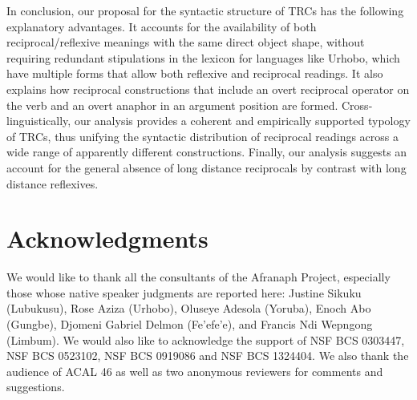 \documentclass[output=paper]{langsci/langscibook}
\begin{document}
In conclusion, our proposal for the syntactic structure of TRCs has the following explanatory advantages. It accounts for the availability of both reciprocal/reflexive meanings with the same direct object shape, without requiring redundant stipulations in the lexicon for languages like Urhobo, which have multiple forms that allow both reflexive and reciprocal readings. It also explains how reciprocal constructions that include an overt reciprocal operator on the verb and an overt anaphor in an argument position are formed. Cross-linguistically, our analysis provides a coherent and empirically supported typology of TRCs, thus unifying the syntactic distribution of reciprocal readings across a wide range of apparently different constructions. Finally, our analysis suggests an account for the general absence of long distance reciprocals by contrast with long distance reflexives.

\section*{Acknowledgments}

We would like to thank all the consultants of the Afranaph Project, especially those whose native speaker judgments are reported here: Justine Sikuku (Lubukusu), Rose Aziza (Urhobo), Oluseye Adesola (Yoruba), Enoch Abo (Gungbe), Djomeni Gabriel Delmon (Fe'efe'e), and Francis Ndi Wepngong (Limbum). We would also like to acknowledge the support of NSF BCS 0303447, NSF BCS 0523102, NSF BCS 0919086 and NSF BCS 1324404. We also thank the audience of ACAL 46 as well as two anonymous reviewers for comments and suggestions.  
\end{document}
